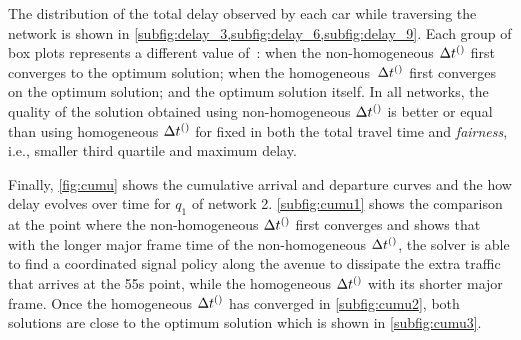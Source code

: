 The distribution of the total delay observed by each car while traversing the
network is shown in \cref{subfig:delay_3,subfig:delay_6,subfig:delay_9}.
%
Each group of box plots represents a different value of~\Nn: when the
non-homogeneous $\DT[]$ first converges to the optimum solution; when the
homogeneous~$\DT[]$ first converges on the optimum solution; and the optimum
solution itself.
%
In all networks, the quality of the solution obtained using non-homogeneous
$\DT[]$ is better or equal than using homogeneous $\DT[]$ for fixed \Nn in both
the total travel time and \emph{fairness}, i.e., smaller third quartile and
maximum delay.



\begin{figure*}[t!]
\centering

%
\caption{Cumulative arrival and departure curves and delay for queue 1 in the
2-by-3 network (\cref{subfig:network2}.
%
The value of \Nn in plots (a) and (b) corresponds, respectively, to the
convergence point of the non-homogeneous and homogeneous approaches
(\cref{subfig:travel_time_6}).
%
(c)~presents the same curves for the  solution.}
%
\label{fig:cumu}
\end{figure*}


Finally, \cref{fig:cumu} shows the cumulative arrival and departure curves and
the how delay evolves over time for $q_1$ of network 2.  \cref{subfig:cumu1}
shows the comparison at the point where the non-homogeneous $\DT[]$ first
converges and shows that with the longer major frame time of the non-homogeneous
$\DT[]$, the solver is able to find a coordinated signal policy along the avenue
to dissipate the extra traffic that arrives at the 55s point, while the
homogeneous $\DT[]$ with its shorter major frame. Once the homogeneous $\DT[]$
has converged in \cref{subfig:cumu2}, both solutions are close to the optimum
solution which is shown in \cref{subfig:cumu3}.




